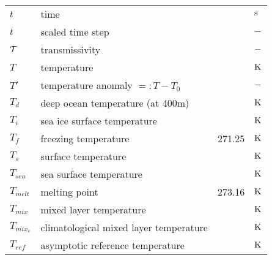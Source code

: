 \begin{tabular*}{\textwidth}{l@{\extracolsep\fill}lll}
$t$       & time                             &         & $\rm s$ \\
$t$       & scaled time step                      &         & $\rm -$ \\
${\cal T}$     & transmissivity    &    &$\rm  -$ \\
$T$       & temperature                      &         & $\rm K$
\\
$T'$           & temperature anomaly $=:T-T_0$              &         & $\rm -$ \\
$T_d$          & deep ocean temperature (at 400m)      &         & $\rm K$
\\
$T_i$          & sea ice surface temperature           &         & $\rm K$ \\
$T_f$          & freezing temperature                  & 271.25  & $\rm K$
\\
$T_s$          & surface temperature                   &         & $\rm K$
\\
$T_{sea}$ & sea surface temperature     &    & $\rm K$ \\
$T_{melt}$     & melting point                    & 273.16  & $\rm K$ \\
$T_{mix}$      & mixed layer temperature               &         & $\rm K$ \\
$T_{mix_c}$    & climatological mixed layer temperature     &         & $\rm K$
\\
$T_{ref}$      & asymptotic reference temperature           &         & $\rm K$ \\
\end{tabular*}

